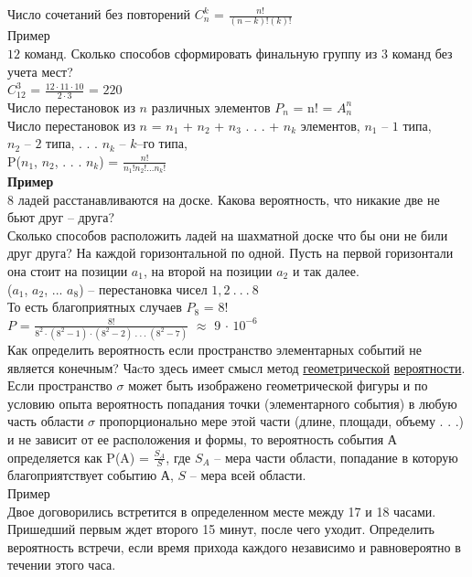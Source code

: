 \documentclass[russian, 12pt, fleqn]{article}
\begin{document}
Число сочетаний без повторений  $C^k_n$ = $\frac{n!}{(n-k)!(k)!}$\\
$\textbf{Пример}$ \\$12$ команд. Сколько способов сформировать финальную группу из $3$ команд без учета мест?\\
  $C^3_{12}$  = $\frac{ 12\cdot11\cdot 10 }{2\cdot3} $ = $220$\\
Число  перестановок из $n$ различных элементов $P_n$ = n! = ${A^n_n}$\\
Число перестановок из $n$ = $n_1$ + $n_2$ +  $n_3$ . . .  + $n_k$ элементов, $n_1$ -- $1$ типа,\\ $n_2$ -- $2$ типа, . . . $n_k$ -- $k$--го типа,\\
P($n_1$,  $n_2$, . . .  $n_k$) = $\frac{n!}{{n_1}!{n_2}!. . .{n_k}!}$\\
\textbf{Пример}\\ 8 ладей расстанавливаются на доске. Какова вероятность, что никакие две не бьют друг -- друга?\\
Сколько способов расположить ладей на шахматной доске что бы они не били друг друга? На каждой горизонтальной по одной. Пусть  на первой горизонтали она стоит на позиции $a_1$,  на второй на позиции $a_2$ и так далее.\\
($a_1$, $a_2$, ... $a_8$)  -- перестановка чисел $1,2\ .\ .\ .\ $8\\
То есть благоприятных случаев $P_8$ = $8$!\\
$P$ = $\frac{8!}{ 8^2 \cdot (8^2 - 1) \cdot (8^2 - 2)  \ .\ .\ . \   (8^2 - 7)} $  $\approx$   9 $\cdot$  $10^{-6}$\\
Как определить вероятность если пространство элементарных событий не\\ является конечным? Чаcто здесь имеет смысл метод \underline{геометрической} \underline{вероятности}.  Если пространство  $\sigma$ может быть изображено геометрической фигуры и по условию опыта вероятность попадания точки (элементарного события) в любую часть области $\sigma$ пропорционально мере этой части (длине, площади, объему . . .) и не зависит от ее расположения и формы, то вероятность события А определяется как P(A) = $\frac{S_A}{S}$, где $S_A$ -- мера части области, попадание в которую благоприятствует событию $А$, $S$ -- мера всей области.\\
$\textbf{Пример}$\\Двое договорились встретится в определенном месте между 17 и 18 часами. Пришедший первым ждет второго 15 минут, после чего уходит. Определить вероятность встречи, если время прихода каждого независимо и равновероятно в течении этого часа.\\
\end{document}
